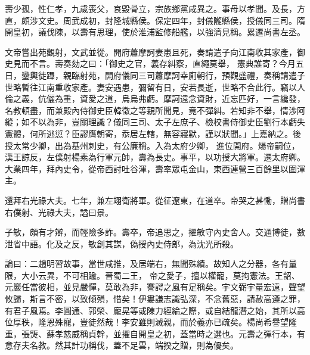 \begin{pinyinscope}
 壽少孤，性仁孝，九歲喪父，哀毀骨立，宗族鄉黨咸異之。事母以孝聞。及長，方直，頗涉文史。周武成初，封隆城縣侯。保定四年，封儀隴縣侯，授儀同三司。隋開皇初，議伐陳，以壽有思理，使於淮浦監修船艦，以強濟見稱。累遷尚書左丞。



 文帝嘗出苑觀射，文武並從。開府蕭摩訶妻患且死，奏請遣子向江南收其家產，御史見而不言。壽奏劾之曰：「御史之官，義存糾察，直繩莫舉，
 憲典誰寄？今月五日，鑾輿徙蹕，親臨射苑，開府儀同三司蕭摩訶幸廁朝行，預觀盛禮，奏稱請遣子世略暫往江南重收家產。妻安遇患，彌留有日，安若長逝，世略不合此行。竊以人倫之義，伉儷為重，資愛之道，烏烏弗虧。摩訶遠念資財，近忘匹好，一言纔發，名教頓盡，而兼殿內侍御史臣韓徵之等親所聞見，竟不彈糾。若知非不舉，情涉阿縱；如不以為非，豈關理識？儀同三司、太子左庶子、檢校書侍御史臣劉行本虧失憲體，何所逃愆？臣謬膺朝寄，忝居左轄，無容寢默，謹以狀聞。」上嘉納之。後授太常少卿，出為基州刺史，有公廉稱。入為太府少卿，
 進位開府。煬帝嗣位，漢王諒反，左僕射楊素為行軍元帥，壽為長史。事平，以功授大將軍。遷太府卿。大業四年，拜內史令，從帝西討吐谷渾，壽率眾屯金山，東西連營三百餘里以圍渾主。



 還拜右光祿大夫。七年，兼左翊衛將軍。從征遼東，在道卒。帝哭之甚慟，贈尚書右僕射、光祿大夫，謚曰景。



 子敏，頗有才辯，而輕險多詐。壽卒，帝追思之，擢敏守內史舍人。交通博徒，數泄省中語。化及之反，敏創其謀，偽授內史侍郎，為沈光所殺。



 論曰：二趙明習故事，當世咸推，及居端右，無聞殊績。故知人之分器，各有量限，大小云異，不可相踰。晉蜀二王，
 帝之愛子，擅以權寵，莫拘憲法。王韶、元巖任當彼相，並見嚴憚，莫敢為非，謇諤之風有足稱矣。宇文弼宇量宏遠，聲望攸歸，斯言不密，以致傾殞，惜矣！伊婁謙志識弘深，不念舊惡，請赦高遵之罪，有君子風焉。李圓通、郭榮、龐晃等或陳力經綸之際，或自結龍潛之始，其所以高位厚秩，隆恩殊寵，豈徒然哉！李安雖則滅親，而於義亦已疏矣。楊尚希譽望隆重，張煚、蘇孝慈威稱貞幹，並擢自開皇之初，蓋當時之選也。元壽之彈行本，有意存夫名教。然其計功稱伐，蓋不足雲，端揆之贈，則為優矣。



\end{pinyinscope}